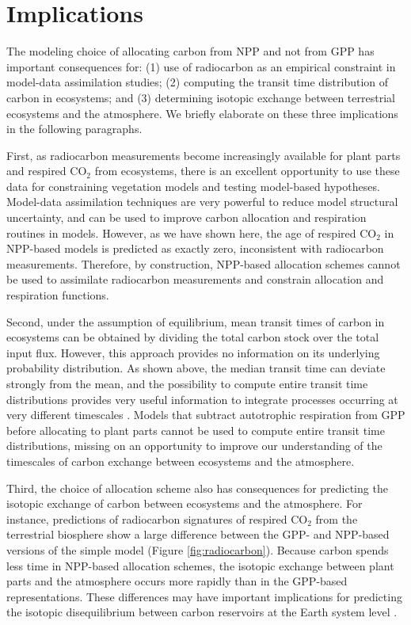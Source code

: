 \documentclass[bg, manuscript]{copernicus}
\begin{document}
\section{Implications}
The modeling choice of allocating carbon from NPP and not from GPP has important consequences for: (1) use of radiocarbon as an empirical constraint in model-data assimilation studies; (2) computing the transit time distribution of carbon in ecosystems; and (3) determining isotopic exchange between terrestrial ecosystems and the atmosphere. We briefly elaborate on these three implications in the following paragraphs. 

First, as radiocarbon measurements become increasingly available for plant parts and respired CO$_2$ from ecosystems, there is an excellent opportunity to use these data for constraining vegetation models and testing model-based hypotheses. Model-data assimilation techniques are very powerful to reduce model structural uncertainty, and can be used to improve carbon allocation and respiration routines in models.  However, as we have shown here, the age of respired CO$_2$ in NPP-based models is predicted as exactly zero, inconsistent with radiocarbon measurements. Therefore, by construction, NPP-based allocation schemes cannot be used to assimilate radiocarbon measurements and constrain allocation and respiration functions. 

Second, under the assumption of equilibrium, mean transit times of carbon in ecosystems can be obtained by dividing the total carbon stock over the total input flux. However, this approach provides no information on its underlying probability distribution. As shown above, the median transit time can deviate strongly from the mean, and the possibility to compute entire transit time distributions provides very useful information to integrate processes occurring at very different timescales \citep{Sierra2021JE}. Models that subtract autotrophic respiration from GPP before allocating to plant parts cannot be used to compute entire transit time distributions, missing on an opportunity to improve our understanding of the timescales of carbon exchange between ecosystems and the atmosphere. 

Third, the choice of allocation scheme also has consequences for predicting the isotopic exchange of carbon between ecosystems and the atmosphere. For instance, predictions of radiocarbon signatures of respired CO$_2$ from the terrestrial biosphere show a large difference between the GPP- and NPP-based versions of the simple model (Figure \ref{fig:radiocarbon}). Because carbon spends less time in NPP-based allocation schemes, the isotopic exchange between plant parts and the atmosphere occurs more rapidly than in the GPP-based representations.
These differences may have important implications for predicting the isotopic disequilibrium between carbon reservoirs at the Earth system level \citep{Randerson2002, Levin2021}. 
\end{document}
